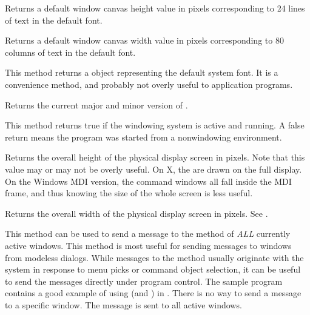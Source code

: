 
Returns a default window canvas height value in pixels corresponding to 24 lines
of text in the default font.


Returns a default window canvas width value in pixels corresponding to 80 columns
of text in the default font.


This method returns a  object representing the default
system font. It is a convenience method, and probably not overly useful
to application programs.


Returns the current major and minor version of \V.


This method returns true if the windowing system is active and
running. A false return means the program was started from
a nonwindowing environment.


Returns the overall height of the physical display screen in pixels.
Note that this value may or may not be overly useful. On X,
the  are drawn on the full display. On
the Windows MDI version, the command windows all fall inside the
MDI frame, and thus knowing the size of the whole screen is less
useful.


Returns the overall width of the physical display screen in pixels.
See .


This method can be used to send a message to the  method
of \emph{ALL} currently active windows. This method is most useful for
sending messages to windows from modeless dialogs. While messages to
the  method usually originate with the system
in response to menu picks or command object selection, it can be
useful to send the messages directly under program control. The
 sample program contains a good example of using
 (and ) in .
There is no way to send a message to a specific window. The message
is sent to all active windows.

